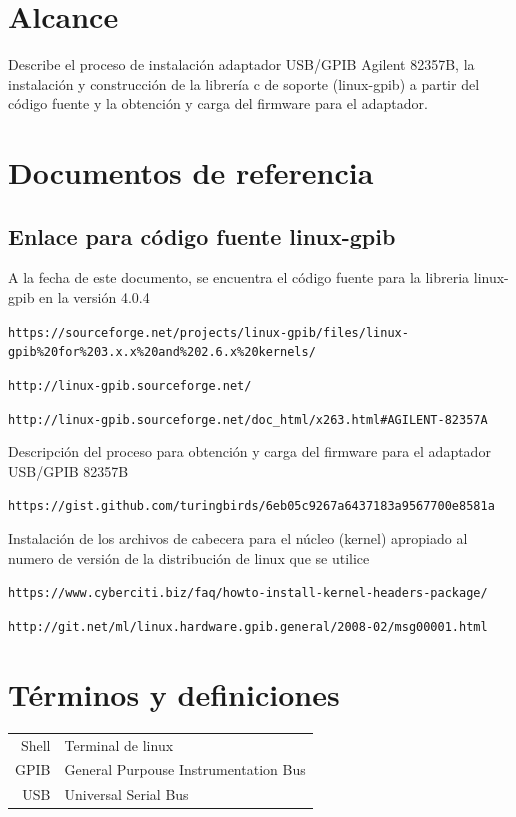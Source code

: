 \documentclass[paper=letter,oneside,fontsize=11pt, parskip=full]{scrartcl}
\begin{document}
	\section{Alcance}
		Describe el proceso de instalación adaptador USB/GPIB Agilent 82357B, la instalación y construcción de la librería c de soporte (linux-gpib) a partir del código fuente y la obtención y carga del firmware para el adaptador.
	
		
	\section{Documentos de referencia}
	\subsection{Enlace para código fuente linux-gpib}
	A la fecha de este documento, se encuentra el código fuente para la libreria linux-gpib en la versión 4.0.4 
	
	\texttt{https://sourceforge.net/projects/linux-gpib/files/linux-gpib\%20for\%203.x.x\%20and\%202.6.x\%20kernels/}
	
	\texttt{http://linux-gpib.sourceforge.net/}
	
	\texttt{http://linux-gpib.sourceforge.net/doc\_html/x263.html\#AGILENT-82357A}
	
	Descripción del proceso para obtención y carga del firmware para el adaptador USB/GPIB 82357B
	
	\texttt{https://gist.github.com/turingbirds/6eb05c9267a6437183a9567700e8581a}
	
	Instalación de los  archivos de cabecera para el núcleo (kernel) apropiado al numero de versión de la distribución de linux que se utilice
	
	\texttt{https://www.cyberciti.biz/faq/howto-install-kernel-headers-package/}
	
	\texttt{http://git.net/ml/linux.hardware.gpib.general/2008-02/msg00001.html}
	
	\section{Términos y definiciones}
	
	\begin{tabular}{rl}
		Shell 	& 	Terminal de linux \\
		GPIB 	& 	General Purpouse Instrumentation Bus \\
		USB		&  	Universal Serial Bus \\
	\end{tabular}
	
\end{document}
